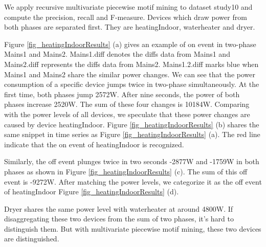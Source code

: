 
We apply recursive multivariate piecewise motif mining to dataset study10 
and compute the precision, recall and F-measure. 
Devices which draw power from both phases are separated first. 
They are heatingIndoor, waterheater and dryer.

Figure \ref{fig_heatingIndoorResults} (a) gives an example of 
on event in two-phase Mains1 and Mains2. 
Mains1.diff denotes the diffs data from Mains1 and Mains2.diff represents 
the diffs data from Mains2. 
Mains1.2.diff marks blue when Mains1 and Mains2 share the similar power changes. 
We can see that 
the power consumption of a specific device jumps twice in two-phase simultaneously.
At the first time, both phases jump 2572W. After nine seconds, 
the power of both phases increase  2520W. 
The sum of these four changes is 10184W. 
Comparing with the power levels of all devices, 
we speculate that these power changes are caused 
by device heatingIndoor. 
Figure \ref{fig_heatingIndoorResults} (b) shares the same snippet in time series as Figure \ref{fig_heatingIndoorResults} (a). 
The red line indicate that the on event of heatingIndoor is recognized.    

Similarly, the off event plunges twice in two seconds -2877W and -1759W in both phases as shown in Figure \ref{fig_heatingIndoorResults} (c).
The sum of this off event is -9272W. 
After matching the power levels, we categorize it as the off event of heatingIndoor Figure \ref{fig_heatingIndoorResults} (d). 

Dryer shares the same power level with waterheater at around 4800W. 
If disaggregating these two devices from the sum of two phases, 
it's hard to distinguish them. 
But with multivariate piecewise motif mining, these two devices 
are distinguished. 


